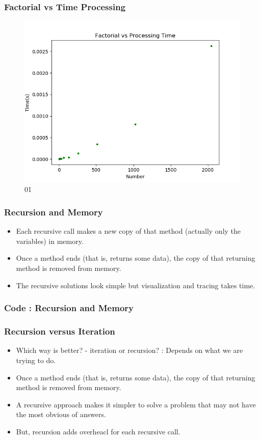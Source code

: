 \documentclass{beamer}
\begin{document}
\begin{frame}
\frametitle{Factorial vs Time Processing}
\begin{figure}
\includegraphics[scale=0.5]{img/ch01_factorial_time.png}
\caption{01}
\end{figure}
\end{frame}


\begin{frame}
\frametitle{Recursion and Memory}
\begin{itemize}
\item Each recursive call makes a new copy of that method (actually only the variables) in memory.
\item Once a method ends (that is, returns some data), the copy of that returning method is removed from memory.
\item The recursive solutions look simple but visualization and tracing takes time.
\end{itemize}
\end{frame}

\begin{frame}
\frametitle{Code : Recursion and Memory}

\end{frame}

\begin{frame}
\frametitle{Recursion versus Iteration}
\begin{itemize}
\item Which way is better? - iteration or recursion? : \alert{Depends on what we are trying to do.}
\item Once a method ends (that is, returns some data), the copy of that returning method is removed from memory.
\item A recursive approach makes it simpler to solve a problem that may not have the most obvious of answers.
\item  But, recursion adds overheacl for each recursive call.
\end{itemize}
\end{frame}
\end{document}
